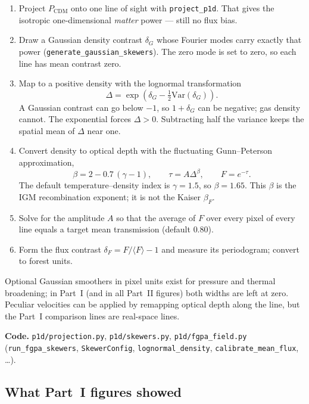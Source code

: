 \documentclass[11pt]{article}
\begin{document}
\begin{enumerate}
\item Project $P_\mathrm{CDM}$ onto one line of sight with \texttt{project\_p1d}.
That gives the isotropic one-dimensional \emph{matter} power --- still no flux bias.
\item Draw a Gaussian density contrast $\delta_G$ whose Fourier modes carry exactly that power (\texttt{generate\_gaussian\_skewers}).
The zero mode is set to zero, so each line has mean contrast zero.
\item Map to a positive density with the lognormal transformation
\begin{equation}
\Delta=\exp\!\left(\delta_G-\tfrac12\mathrm{Var}(\delta_G)\right).
\end{equation}
A Gaussian contrast can go below $-1$, so $1+\delta_G$ can be negative; gas density cannot.
The exponential forces $\Delta>0$.
Subtracting half the variance keeps the spatial mean of $\Delta$ near one.
\item Convert density to optical depth with the fluctuating Gunn--Peterson approximation,
\begin{equation}
\beta=2-0.7\,(\gamma-1),\qquad
\tau=A\Delta^{\beta},\qquad
F=e^{-\tau}.
\end{equation}
The default temperature--density index is $\gamma=1.5$, so $\beta=1.65$.
This $\beta$ is the IGM recombination exponent; it is not the Kaiser $\beta_F$.
\item Solve for the amplitude $A$ so that the average of $F$ over every pixel of every line equals a target mean transmission (default $0.80$).
\item Form the flux contrast $\delta_F=F/\langle F\rangle-1$ and measure its periodogram; convert to forest units.
\end{enumerate}

Optional Gaussian smoothers in pixel units exist for pressure and thermal broadening; in Part~I (and in all Part~II figures) both widths are left at zero.
Peculiar velocities can be applied by remapping optical depth along the line, but the Part~I comparison lines are real-space lines.

\textbf{Code.}
\texttt{p1d/projection.py}, \texttt{p1d/skewers.py}, \texttt{p1d/fgpa\_field.py}
(\texttt{run\_fgpa\_skewers}, \texttt{SkewerConfig}, \texttt{lognormal\_density}, \texttt{calibrate\_mean\_flux}, \ldots).

\subsection{What Part~I figures showed}
\end{document}
